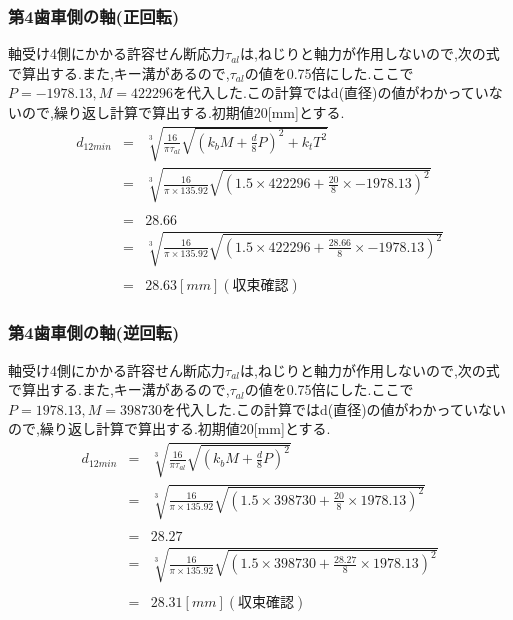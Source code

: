 \subsubsection{第4歯車側の軸(正回転)}
軸受け4側にかかる許容せん断応力$\tau_{al}$は,ねじりと軸力が作用しないので,次の式で算出する.また,キー溝があるので,$\tau_{al}$の値を0.75倍にした.ここで$P=-1978.13,M=422296$を代入した.この計算ではd(直径)の値がわかっていないので,繰り返し計算で算出する.初期値20[mm]とする.
\begin{eqnarray}
d_{12min}&=& \sqrt [3]{ \frac{16}{\pi \tau_{al}}\sqrt{(k_bM+\frac{d}{8}P)^2+k_tT^2} }\\
       &=& \sqrt [3]{ \frac{16}{\pi \times 135.92} \sqrt{(1.5 \times 422296 +\frac{20}{8}\times -1978.13)^2}}\nonumber\\
\\
       &=&28.66\\
&=& \sqrt [3]{ \frac{16}{\pi \times 135.92} \sqrt{(1.5 \times 422296 +\frac{28.66}{8}\times -1978.13)^2}}\nonumber\\
\\
         &=& 28.63[mm](収束確認)
\end{eqnarray}
\subsubsection{第4歯車側の軸(逆回転)}
軸受け4側にかかる許容せん断応力$\tau_{al}$は,ねじりと軸力が作用しないので,次の式で算出する.また,キー溝があるので,$\tau_{al}$の値を0.75倍にした.ここで$P=1978.13,M=398730$を代入した.この計算ではd(直径)の値がわかっていないので,繰り返し計算で算出する.初期値20[mm]とする.
\begin{eqnarray}
d_{12min}&=& \sqrt [3]{ \frac{16}{\pi \tau_{al}}\sqrt{(k_bM+\frac{d}{8}P)^2} }\\
       &=& \sqrt [3]{ \frac{16}{\pi \times 135.92} \sqrt{(1.5 \times 398730 +\frac{20}{8}\times 1978.13)^2}}\nonumber\\
\\
&=& 28.27\\
       &=& \sqrt [3]{ \frac{16}{\pi \times 135.92} \sqrt{(1.5 \times 398730 +\frac{28.27}{8}\times 1978.13)^2}}\nonumber\\
\\
         &=& 28.31[mm](収束確認)
\end{eqnarray}
